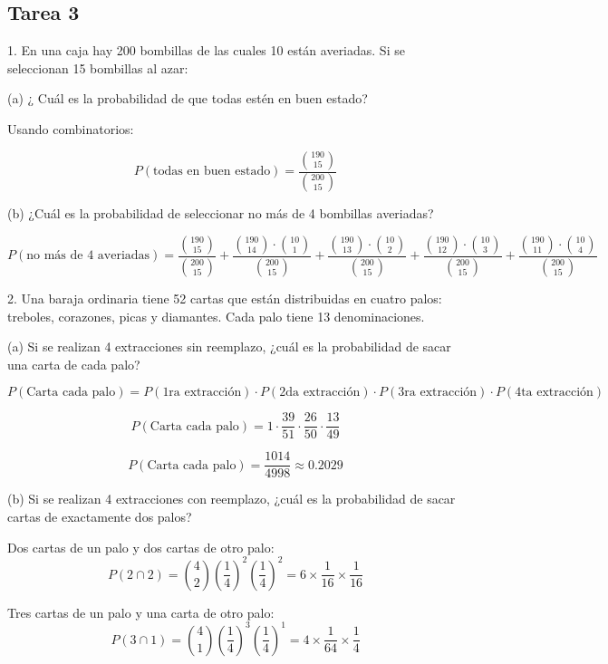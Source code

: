 \documentclass{report}
\begin{document}

    \pagebreak
    \subsection*{Tarea 3}

1. En una caja hay 200 bombillas de las cuales 10 están averiadas. Si se seleccionan 15 bombillas al azar:

(a) ¿ Cuál es la probabilidad de que todas estén en buen estado?

Usando combinatorios:

$$P(\text{todas en buen estado}) = \frac{{\binom{190}{15}}}{{\binom{200}{15}}}$$

(b) ¿Cuál es la probabilidad de seleccionar no más de 4 bombillas averiadas?

$$P(\text{no más de 4 averiadas}) = \frac{{\binom{190}{15}}}{{\binom{200}{15}}} + \frac{{\binom{190}{14} \cdot \binom{10}{1}}}{{\binom{200}{15}}} + \frac{{\binom{190}{13} \cdot \binom{10}{2}}}{{\binom{200}{15}}} + \frac{{\binom{190}{12} \cdot \binom{10}{3}}}{{\binom{200}{15}}} + \frac{{\binom{190}{11} \cdot \binom{10}{4}}}{{\binom{200}{15}}}$$

2. Una baraja ordinaria tiene 52 cartas que están distribuidas en cuatro palos: treboles, corazones, picas y diamantes. Cada palo tiene 13 denominaciones.

(a) Si se realizan 4 extracciones sin reemplazo, ¿cuál es la probabilidad de sacar una carta de cada palo?

$$P(\text{Carta cada palo}) = P(\text{1ra extracción}) \cdot P(\text{2da extracción}) \cdot P(\text{3ra extracción}) \cdot P(\text{4ta extracción})$$

$$P(\text{Carta cada palo}) = 1 \cdot \frac{39}{51} \cdot \frac{26}{50} \cdot \frac{13}{49}$$

$$P(\text{Carta cada palo}) = \frac{1014}{4998} \approx 0.2029$$

(b) Si se realizan 4 extracciones con reemplazo, ¿cuál es la probabilidad de sacar cartas de exactamente dos palos?

Dos cartas de un palo y dos cartas de otro palo: 
$$ P(2 \cap 2) = \binom{4}{2} \left(\frac{1}{4}\right)^2 \left(\frac{1}{4}\right)^2 = 6 \times \frac{1}{16} \times \frac{1}{16} $$

Tres cartas de un palo y una carta de otro palo: 
$$ P(3\cap 1) = \binom{4}{1} \left(\frac{1}{4}\right)^3 \left(\frac{1}{4}\right)^1 = 4 \times \frac{1}{64} \times \frac{1}{4} $$
\end{document}
